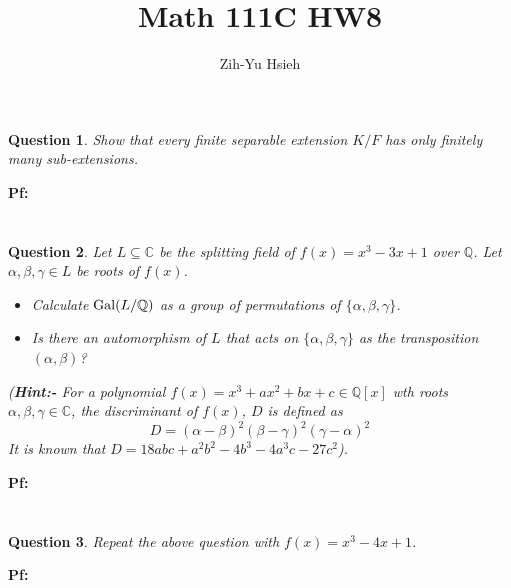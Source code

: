 \documentclass{article}
\title{Math 111C HW8}
\author{Zih-Yu Hsieh}
\newtheorem{question}{Question}
\newcommand{\QQ}{\mathbb{Q}}
\newcommand{\CC}{\mathbb{C}}
\newcommand{\Gal}{\textmd{Gal}}
\begin{document}
\maketitle

\section{}
\begin{question}\label{q1}
    Show that every finite separable extension $K/F$ has only finitely many sub-extensions.
\end{question}

\textbf{Pf:}

\break

\section{}
\begin{question}\label{q2}
    Let $L\subseteq\mathbb{C}$ be the splitting field of $f(x)=x^3-3x+1$ over $\mathbb{Q}$. Let $\alpha,\beta,\gamma\in L$ be roots of $f(x)$.
    \begin{itemize}
        \item[(a)] Calculate $\Gal(L/\QQ)$ as a group of permutations of $\{\alpha,\beta,\gamma\}$.
        \item[(b)] Is there an automorphism of $L$ that acts on $\{\alpha,\beta,\gamma\}$ as the transposition $(\alpha,\beta)$?
    \end{itemize}
    (\textbf{Hint:-} For a polynomial $f(x)=x^3+ax^2+bx+c\in\QQ[x]$ wth roots $\alpha,\beta,\gamma\in \CC$, the discriminant of $f(x)$, $D$ is defined as 
    $$D=(\alpha-\beta)^2(\beta-\gamma)^2(\gamma-\alpha)^2$$
    It is known that $D=18abc+a^2b^2-4b^3-4a^3c-27c^2$).
\end{question}

\textbf{Pf:}

\break

\section{}
\begin{question}\label{q3}
    Repeat the above question with $f(x)=x^3-4x+1$.
\end{question}

\textbf{Pf:}

\break
\end{document}

